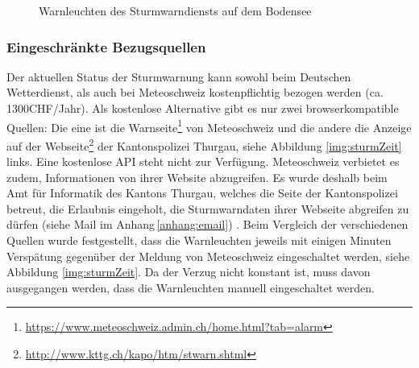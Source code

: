 \begin{figure}[htbp!]
	\centering
	\caption{Warnleuchten des Sturmwarndiensts auf dem Bodensee}
	\label{img:sturm2}
\end{figure}



\subsubsection{Eingeschränkte Bezugsquellen}
Der aktuellen Status der Sturmwarnung kann sowohl beim Deutschen Wetterdienst, als auch bei Meteoschweiz kostenpflichtig bezogen werden (ca. 1300CHF/Jahr). Als kostenlose Alternative gibt es nur zwei browserkompatible Quellen: Die eine ist die Warnseite\footnote{ \url{https://www.meteoschweiz.admin.ch/home.html?tab=alarm}}  von Meteoschweiz und die andere die Anzeige auf der Webseite\footnote{ \url{http://www.kttg.ch/kapo/htm/stwarn.shtml}} der Kantonspolizei Thurgau, siehe Abbildung \ref{img:sturmZeit} links. Eine kostenlose API steht nicht zur Verfügung. Meteoschweiz verbietet es zudem, Informationen von ihrer Website abzugreifen. Es wurde deshalb beim Amt für Informatik des Kantons Thurgau, welches die Seite der Kantonspolizei betreut, die Erlaubnis eingeholt, die Sturmwarndaten ihrer Webseite abgreifen zu dürfen (siehe Mail im Anhang\,\ref{anhang:email}) . Beim Vergleich der verschiedenen Quellen wurde festgestellt, dass die Warnleuchten jeweils mit einigen Minuten Verspätung gegenüber der Meldung von Meteoschweiz eingeschaltet werden, siehe Abbildung \ref{img:sturmZeit}. Da der Verzug nicht konstant ist, muss davon ausgegangen werden, dass die Warnleuchten manuell eingeschaltet werden.\\

